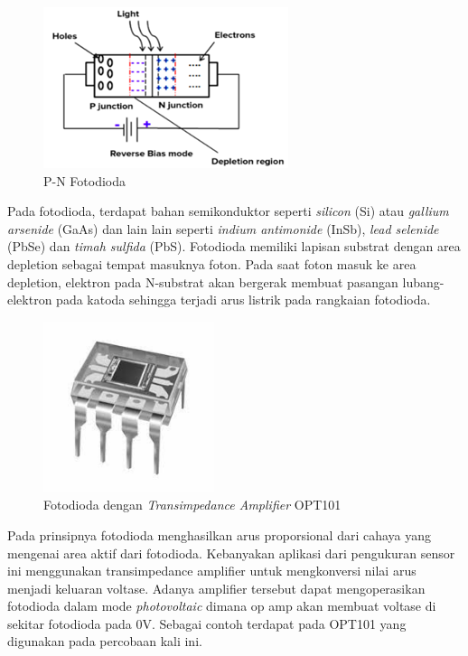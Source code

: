 \begin{figure}[H]
    \centering
    \includegraphics{Images/Bias Fotodioda.png}
    \caption{P-N Fotodioda}
    \label{fig:p-n photodiode}
\end{figure}

Pada fotodioda, terdapat bahan semikonduktor seperti \textit{silicon} (Si) atau \textit{gallium
arsenide} (GaAs) dan lain lain seperti \textit{indium antimonide} (InSb), \textit{lead selenide}
(PbSe) dan \textit{timah sulfida} (PbS). Fotodioda memiliki lapisan substrat dengan area depletion
sebagai tempat masuknya foton. Pada saat foton masuk ke area depletion, elektron pada N-substrat
akan bergerak membuat pasangan lubang-elektron pada katoda sehingga terjadi arus listrik pada
rangkaian fotodioda\cite{Vlasov2023}.

\begin{figure}[H]
    \centering
    \includegraphics[width=5cm]{Images/OPT101.jpg}
    \caption{Fotodioda dengan \textit{Transimpedance Amplifier} OPT101}
    \label{fig:opt101}
\end{figure}

Pada prinsipnya fotodioda menghasilkan arus proporsional dari cahaya yang mengenai area aktif dari
fotodioda. Kebanyakan aplikasi dari pengukuran sensor ini menggunakan transimpedance amplifier
untuk mengkonversi nilai arus menjadi keluaran voltase. Adanya amplifier tersebut dapat
mengoperasikan fotodioda dalam mode \textit{photovoltaic} dimana op amp akan membuat voltase di
sekitar fotodioda pada 0V. Sebagai contoh terdapat pada OPT101 yang digunakan pada percobaan kali
ini.




